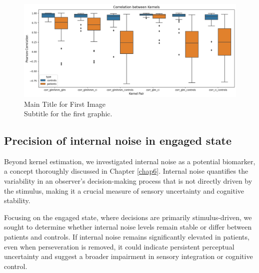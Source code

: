 \begin{figure}[H]
    \centering
    \includegraphics[width=14cm]{MainLayout/Images/chapter7/corr.png}
    \caption{Main Title for First Image \\ \small Subtitle for the first graphic.}
    \label{fig:corr_distance}
\end{figure}

\subsection{Precision of internal noise in engaged state}
Beyond kernel estimation, we investigated internal noise as a potential biomarker, a concept thoroughly discussed in Chapter \ref{chap6}. Internal noise quantifies the variability in an observer’s decision-making process that is not directly driven by the stimulus, making it a crucial measure of sensory uncertainty and cognitive stability.

Focusing on the engaged state, where decisions are primarily stimulus-driven, we sought to determine whether internal noise levels remain stable or differ between patients and controls. If internal noise remains significantly elevated in patients, even when perseveration is removed, it could indicate persistent perceptual uncertainty and suggest a broader impairment in sensory integration or cognitive control.


